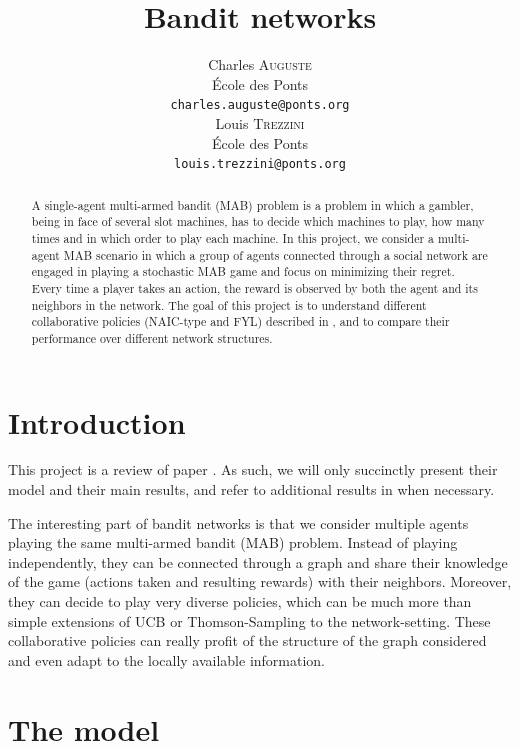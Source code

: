 \documentclass{article}
\title{Bandit networks}
\author{%
  Charles \textsc{Auguste} \\
  École des Ponts \\
  \texttt{charles.auguste@ponts.org} \\
  \And
  Louis \textsc{Trezzini} \\
  École des Ponts \\
  \texttt{louis.trezzini@ponts.org} \\
}
\begin{document}
\maketitle

\begin{abstract}
  A single-agent multi-armed bandit (MAB) problem is a problem in which a gambler, being in face of several slot machines, has to decide which machines to play, how many times and in which order to play each machine.
  In this project, we consider a multi-agent MAB scenario in which a group of agents connected through a social network are engaged in playing a stochastic MAB game and focus on minimizing their regret. Every time a player takes an action, the reward is observed by both the agent and its neighbors in the network.
  The goal of this project is to understand different collaborative policies (NAIC-type and FYL) described in \cite{DBLP:journals/corr/KollaJG16}, and to compare their performance over different network structures.
\end{abstract}

\section{Introduction}
This project is a review of paper \cite{DBLP:journals/corr/KollaJG16}. As such, we will only succinctly present their model and their main results, and refer to additional results in \cite{DBLP:journals/corr/KollaJG16} when necessary.

The interesting part of bandit networks is that we consider multiple agents playing the same multi-armed bandit (MAB) problem. Instead of playing independently, they can be connected through a graph and share their knowledge of the game (actions taken and resulting rewards) with their neighbors. Moreover, they can decide to play very diverse policies, which can be much more than simple extensions of UCB or Thomson-Sampling to the network-setting. These collaborative policies can really profit of the structure of the graph considered and even adapt to the locally available information.

\section{The model}
\end{document}
